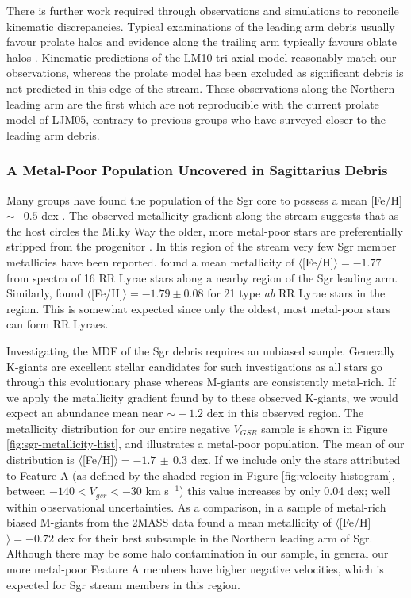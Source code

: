 	There is further work required through observations and simulations to reconcile kinematic discrepancies. Typical examinations of the leading arm debris usually favour prolate halos and evidence along the trailing arm typically favours oblate halos \citep{Helmi_2004, Martinez-Delgado;et-al_2004, Law;et-al_2005}. Kinematic predictions of the LM10 tri-axial model reasonably match our observations, whereas the prolate model has been excluded as significant debris is not predicted in this edge of the stream. These observations along the Northern leading arm are the first which are not reproducible with the current prolate model of LJM05, contrary to previous groups who have surveyed closer to the leading arm debris.

	\subsubsection{A Metal-Poor Population Uncovered in Sagittarius Debris}
	\label{sec:ch1-sgr-metal-poor}
		
	Many groups have found the population of the Sgr core to possess a mean [Fe/H] $\sim -0.5$ dex \citep{Cacciari;et-al_2002, Bonifacio;et-al_2004, Monaco;et-al_2005}. The observed metallicity gradient along the stream suggests that as the host circles the Milky Way the older, more metal-poor stars are preferentially stripped from the progenitor \citep{Chou;et-al_2007, Keller;Yong;Da_Costa_2010}. In this region of the stream very few Sgr member metallicies have been reported. \citet{Vivas;et-al_2005} found a mean metallicity of $\langle$[Fe/H]$\rangle = -1.77$ from spectra of 16 RR Lyrae stars along a nearby region of the Sgr leading arm. Similarly, \citet{Prior;et-al_2009b} found $\langle$[Fe/H]$\rangle = -1.79 \pm 0.08$ for 21 type \textit{ab} RR Lyrae stars in the region. This is somewhat expected since only the oldest, most metal-poor stars can form RR Lyraes. 
	
	Investigating the MDF of the Sgr debris requires an unbiased sample. Generally K-giants are excellent stellar candidates for such investigations as all stars go through this evolutionary phase whereas M-giants are consistently metal-rich. If we apply the metallicity gradient found by \citet[][from M-giants]{Keller;Yong;Da_Costa_2010} to these observed K-giants, we would expect an abundance mean near $\sim{}-1.2$ dex in this observed region. The metallicity distribution for our entire negative $V_{GSR}$ sample is shown in Figure \ref{fig:sgr-metallicity-hist}, and illustrates a metal-poor population. The mean of our distribution is $\langle$[Fe/H]$\rangle = -1.7\,\pm\,0.3$ dex. If we include only the stars attributed to Feature A (as defined by the shaded region in Figure \ref{fig:velocity-histogram}, between $-140 < V_{gsr} < -30$ km s$^{-1}$) this value increases by only 0.04 dex; well within observational uncertainties. As a comparison, in a sample of metal-rich biased M-giants from the 2MASS data \citet{Chou;et-al_2007} found a mean metallicity of $\langle$[Fe/H]$\rangle = -0.72$ dex for their best subsample in the Northern leading arm of Sgr. Although there may be some halo contamination in our sample, in general our more metal-poor Feature A members have higher negative velocities, which is expected for Sgr stream members in this region.
		
